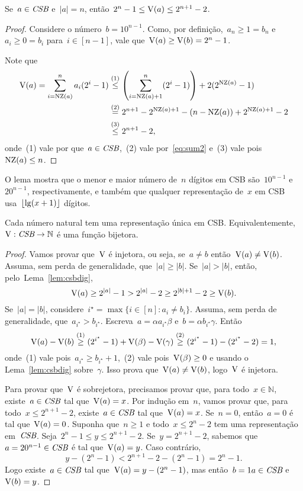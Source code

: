 \documentclass[main.tex]{subfiles}
\begin{document}
\begin{lemma} \label{lem:csbdig}
	Se~$a \in \textit{CSB}$ e~$|a| = n$, então~$2^n - 1 \leq \operatorname{V}(a) \leq 2^{n+1}-2$.
\end{lemma}
\begin{proof}
	Considere o número~$b = 10^{n-1}$. Como, por definição,~$a_n \geq 1 = b_n$ e~$a_i \geq 0 = b_i$ para~$i \in [n - 1]$, vale que~$\operatorname{V}(a) \geq \operatorname{V}(b) = 2^n - 1$.

	Note que
	\begin{align*}
	\operatorname{V}(a) = \sum\limits_{i = \operatorname{NZ}(a)}^n{a_i (2^i - 1)} &\stackrel{\text{(1)}}{\leq} \left(\sum\limits_{i = \operatorname{NZ}(a) + 1}^n (2^i - 1)\right) + 2 (2^{\operatorname{NZ}(a)} - 1) \\
	&\stackrel{\text{(2)}}{=} 2^{n+1} - 2^{\operatorname{NZ}(a)+1} - (n - \operatorname{NZ}(a)) + 2^{\operatorname{NZ}(a) + 1} - 2 \\
	&\stackrel{\text{(3)}}{\leq} 2^{n+1} - 2,
	\end{align*}
	onde~(1) vale por que~$a \in \textit{CSB}$,~(2) vale por~\eqref{eq:sum2} e~(3) vale pois~$\operatorname{NZ}(a) \leq n$.
\end{proof}

O lema mostra que o menor e maior número de~$n$ dígitos em CSB são~$10^{n-1}$ e~$20^{n-1}$, respectivamente, e também que qualquer representação de~$x$ em CSB usa~$\lfloor\lg(x + 1)\rfloor$ dígitos.

\begin{theorem} \label{thm:csbbij}
	Cada número natural tem uma representação única em CSB. Equivalentemente,~${\operatorname{V}: \textit{CSB} \rightarrow \mathbb{N}}$ é uma função bijetora.
\end{theorem}
\begin{proof}
	Vamos provar que~$\operatorname{V}$ é injetora, ou seja, se~${a \neq b}$ então~${\operatorname{V}(a) \neq \operatorname{V}(b)}$. Assuma, sem perda de generalidade, que~$|a| \geq |b|$. Se~$|a| > |b|$, então, pelo~Lema~\ref{lem:csbdig},
	$$ \operatorname{V}(a) \geq 2^{|a|} - 1 > 2^{|a|} - 2 \geq 2^{|b| + 1} - 2 \geq \operatorname{V}(b). $$
	Se~$|a| = |b|$, considere~${i^\star = \max\{i \in [n] : a_i \neq b_i\}}$. Assuma, sem perda de generalidade, que~${a_{i^\star} > b_{i^\star}}$. Escreva~${a = \alpha a_{i^\star} \beta}$ e~${b = \alpha b_{i^\star} \gamma}$. Então
	$$ \operatorname{V}(a) - \operatorname{V}(b) \stackrel{\text{(1)}}{\geq} (2^{i^\star} - 1) + \operatorname{V}(\beta) - \operatorname{V}(\gamma) \stackrel{\text{(2)}}{\geq} (2^{i^\star} - 1) - (2^{i^\star} - 2) = 1, $$
	onde~(1) vale pois~$a_{i^\star} \geq b_{i^\star} + 1$,~(2) vale pois~$\operatorname{V}(\beta) \geq 0$ e usando o Lema~\ref{lem:csbdig} sobre~$\gamma$. Isso prova que~$\operatorname{V}(a) \neq \operatorname{V}(b)$, logo~$\operatorname{V}$ é injetora.

	Para provar que~$\operatorname{V}$ é sobrejetora, precisamos provar que, para todo~$x \in \mathbb{N}$, existe~${a \in \textit{CSB}}$ tal que~${\operatorname{V}(a) = x}$. Por indução em~$n$, vamos provar que, para todo~${x \leq 2^{n+1} - 2}$, existe~${a \in \textit{CSB}}$ tal que~${\operatorname{V}(a) = x}$. Se~$n = 0$, então~$a = 0$ é tal que~$\operatorname{V}(a) = 0$. Suponha que~$n \geq 1$ e todo~${x \leq 2^n - 2}$ tem uma representação em~$\textit{CSB}$. Seja~${2^n - 1 \leq y \leq 2^{n+1} - 2}$. Se~$y = 2^{n+1} - 2$, sabemos que~${a = 20^{n-1} \in \textit{CSB}}$ é tal que~$\operatorname{V}(a) = y$. Caso contrário,~
	$$y - (2^n - 1) < 2^{n+1} - 2 - (2^n - 1) = 2^n - 1.$$
	Logo existe~$a \in \textit{CSB}$ tal que~${\operatorname{V}(a) = y - (2^n - 1)}$, mas então~$b = 1a \in \textit{CSB}$ e~$\operatorname{V}(b) = y$.
\end{proof}
\end{document}

